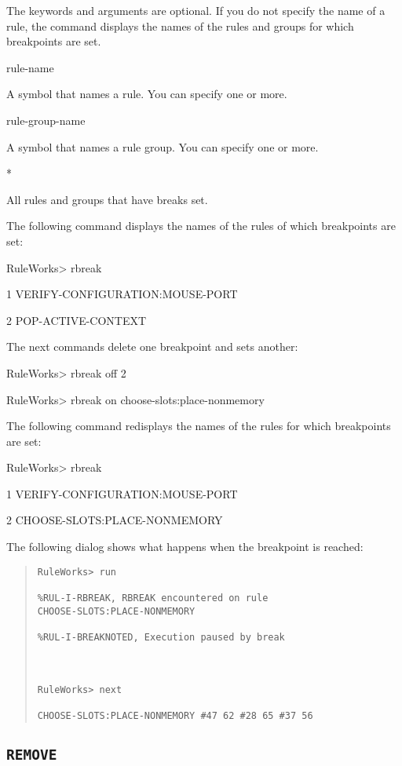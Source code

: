 {{The keywords and arguments are optional. If you do not
specify the name of a rule, the command displays the names of
the rules and groups for which breakpoints are set.

\Arguments

rule-name

A symbol that names a rule. You can specify one or more.

rule-group-name

A symbol that names a rule group. You can specify one or
more.

*

All rules and groups that have breaks set.

\Example

The following command displays the names of the rules of
which breakpoints are set:

RuleWorks> rbreak

1 VERIFY-CONFIGURATION:MOUSE-PORT

2 POP-ACTIVE-CONTEXT

The next commands delete one breakpoint and sets another:

RuleWorks> rbreak off 2

RuleWorks> rbreak on choose-slots:place-nonmemory

The following command redisplays the names of the rules for
which breakpoints are set:

RuleWorks> rbreak

1 VERIFY-CONFIGURATION:MOUSE-PORT

2 CHOOSE-SLOTS:PLACE-NONMEMORY

The following dialog shows what happens when the breakpoint
is reached:
\begin{quote}
\begin{verbatim}
RuleWorks> run

%RUL-I-RBREAK, RBREAK encountered on rule
CHOOSE-SLOTS:PLACE-NONMEMORY

%RUL-I-BREAKNOTED, Execution paused by break



RuleWorks> next

CHOOSE-SLOTS:PLACE-NONMEMORY #47 62 #28 65 #37 56
\end{verbatim}
\end{quote}

\subsection{\tt{REMOVE}}

}}
